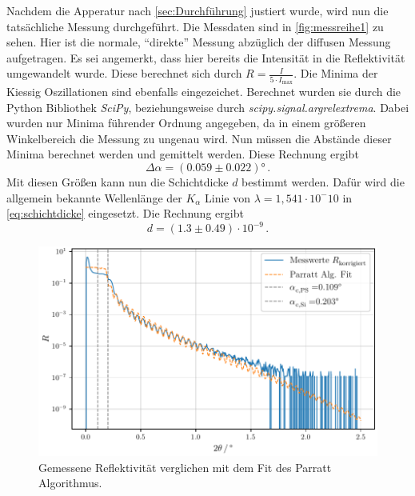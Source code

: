 Nachdem die Apperatur nach \autoref{sec:Durchführung} justiert wurde, wird nun die tatsächliche Messung durchgeführt.
Die Messdaten sind in \autoref{fig:messreihe1} zu sehen.
Hier ist die normale, \enquote{direkte} Messung abzüglich der diffusen Messung aufgetragen.
Es sei angemerkt, dass hier bereits die Intensität in die Reflektivität umgewandelt wurde.
Diese berechnet sich durch $R = \frac{I}{ 5 \cdot I_\text{max}}$.
Die Minima der Kiessig Oszillationen sind ebenfalls eingezeichet.
Berechnet wurden sie durch die Python Bibliothek \textit{SciPy}, beziehungsweise durch \textit{scipy.signal.argrelextrema}.
Dabei wurden nur Minima führender Ordnung angegeben, da in einem größeren Winkelbereich die Messung zu ungenau wird.
Nun müssen die Abstände dieser Minima berechnet werden und gemittelt werden.
Diese Rechnung ergibt
\begin{equation*}
    \Delta \alpha = (0.059 \pm 0.022) \unit\degree \, .
\end{equation*}
Mit diesen Größen kann nun die Schichtdicke $d$ bestimmt werden.
Dafür wird die allgemein bekannte Wellenlänge der $K_\alpha$ Linie von $\lambda = 1, 541 \cdot 10^-10$ in \autoref{eq:schichtdicke} eingesetzt.
Die Rechnung ergibt
\begin{equation*}
    d = (1.3 \pm 0.49) \cdot 10^{-9} \, .
\end{equation*}

\begin{figure}
    \centering
    \includegraphics[width = 0.5 \linewidth]{build/messung2.pdf}
    \caption{Gemessene Reflektivität verglichen mit dem Fit des Parratt Algorithmus.}
    \label{fig:messreihe2}
\end{figure}

